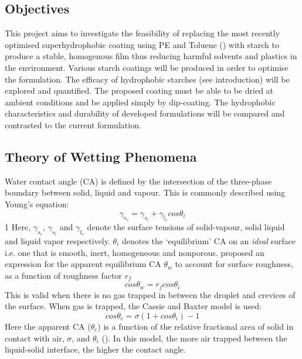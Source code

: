 \subsection{Objectives}

This project aims to investigate the feasibility of replacing the  most recently optimised superhydrophobic coating using PE and Toluene (\cite{fang_2019}) with starch to produce a stable, homogenous film thus reducing harmful solvents and plastics in the environment. Various starch coatings will be produced in order to optimise the formulation. The efficacy of hydrophobic starches (see introduction) will be explored and quantified. The proposed coating must be able to be dried at ambient conditions and be applied simply by dip-coating.  The hydrophobic characteristics and durability of developed formulations will be compared and contrasted to the current formulation. 
\newpage
\subsection{Theory of Wetting Phenomena} 
Water contact angle (CA) is defined by the intersection of the three-phase boundary between solid, liquid and vapour. This is commonly described using Young’s equation:
\begin{equation}
\label{Young}
\gamma_s_v = \gamma_s_l + \gamma_l_v cos \theta_i
\end{equation}1
Here, $\gamma_s_v$, $\gamma_s_l$ and $\gamma_l_v$ denote the surface tensions of solid-vapour, solid liquid and liquid vapor respectively. $\theta_i$ denotes the ‘equilibrium’ CA on an \emph{ideal} surface i.e. one that is smooth, inert, homogeneous and nonporous. \cite{wenzel_1936} proposed an expression for the apparent equilibrium CA $\theta_w$ to account for surface roughness, as a function of roughness factor $r_f$
\begin{equation}
\label{Young}
cos \theta_w = r_f cos \theta_i
\end{equation}
This is valid when there is no gas trapped in between the droplet and crevices of the surface. When gas is trapped,  the Cassie and Baxter model is used: 
\begin{equation}
\label{Young}
cos \theta_c = \sigma (1+ cos \theta_i) -1
\end{equation}
Here the apparent CA ($\theta_c$) is a function of the relative fractional area of solid in contact with air, $\sigma$, and $\theta_i$ (\cite{cassie_baxter_1944}). In this model, the more air trapped between the liquid-solid interface, the higher the contact angle. 

